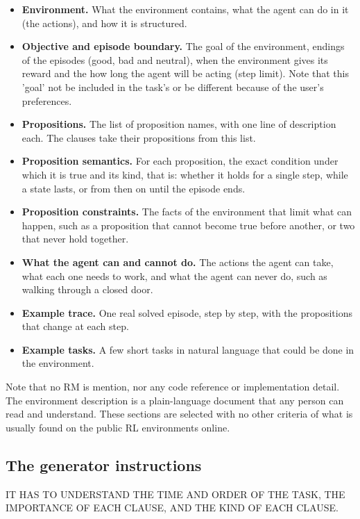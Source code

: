 \documentclass[11pt,english,listoffigures,listoftables]{tfgetsinf}
\begin{document}
\begin{itemize}
    \item \textbf{Environment.} What the environment contains, what the agent can do in it (the actions), and how it is structured.
    \item \textbf{Objective and episode boundary.} The goal of the environment, endings of the episodes (good, bad and neutral), when the environment gives its reward and the how long the agent will be acting (step limit). Note that this 'goal' not be included in the task's or be different because of the user's preferences.
    \item \textbf{Propositions.} The list of proposition names, with one line of description each. The clauses take their propositions from this list.
    \item \textbf{Proposition semantics.} For each proposition, the exact condition under which it is true and its kind, that is: whether it holds for a single step, while a state lasts, or from then on until the episode ends.
    \item \textbf{Proposition constraints.} The facts of the environment that limit what can happen, such as a proposition that cannot become true before another, or two that never hold together.
    \item \textbf{What the agent can and cannot do.} The actions the agent can take, what each one needs to work, and what the agent can never do, such as walking through a closed door.
    \item \textbf{Example trace.} One real solved episode, step by step, with the propositions that change at each step.
    \item \textbf{Example tasks.} A few short tasks in natural language that could be done in the environment.
\end{itemize}

Note that no RM is mention, nor any code reference or implementation detail. The environment description is a plain-language document that any person can read and understand. These sections are selected with no other criteria of what is usually found on the public RL environments online.


\subsection{The generator instructions}
\label{tab:ibm-prompt}

IT HAS TO UNDERSTAND THE TIME AND ORDER OF THE TASK, THE IMPORTANCE OF EACH CLAUSE, AND THE KIND OF EACH CLAUSE.
\end{document}
